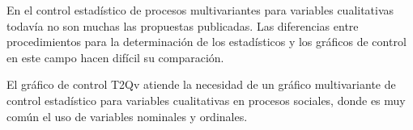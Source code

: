 \documentclass[mathematics,article,submit,moreauthors,pdftex]{mdpi}
\begin{document}
En el control estadístico de procesos multivariantes para variables
cualitativas todavía no son muchas las propuestas publicadas. Las
diferencias entre procedimientos para la determinación de los
estadísticos y los gráficos de control en este campo hacen difícil su
comparación.

El gráfico de control T2Qv atiende la necesidad de un gráfico
multivariante de control estadístico para variables cualitativas en
procesos sociales, donde es muy común el uso de variables nominales y
ordinales.

%

\vspace{6pt}








\end{document}
